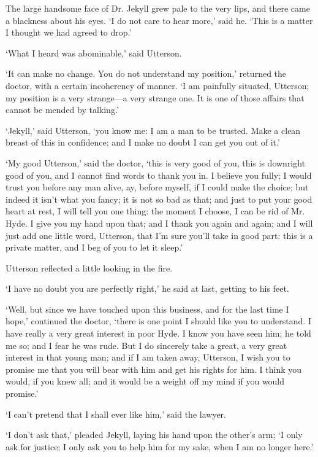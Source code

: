 \documentclass[]{novel}
\begin{document}
The large handsome face of Dr. Jekyll grew pale to the very lips, and there came a blackness about his eyes. ‘I do not care to hear more,’ said he. ‘This is a matter I thought we had agreed to drop.’

‘What I heard was abominable,’ said Utterson.

‘It can make no change. You do not understand my position,’ returned the doctor, with a certain incoherency of manner. ‘I am painfully situated, Utterson; my position is a very strange—a very strange one. It is one of those affairs that cannot be mended by talking.’

‘Jekyll,’ said Utterson, ‘you know me: I am a man to be trusted. Make a clean breast of this in confidence; and I make no doubt I can get you out of it.’

‘My good Utterson,’ said the doctor, ‘this is very good of you, this is downright good of you, and I cannot find words to thank you in. I believe you fully; I would trust you before any man alive, ay, before myself, if I could make the choice; but indeed it isn’t what you fancy; it is not so bad as that; and just to put your good heart at rest, I will tell you one thing: the moment I choose, I can be rid of Mr. Hyde. I give you my hand upon that; and I thank you again and again; and I will just add one little word, Utterson, that I’m sure you’ll take in good part: this is a private matter, and I beg of you to let it sleep.’

Utterson reflected a little looking in the fire.

‘I have no doubt you are perfectly right,’ he said at last, getting to his feet.

‘Well, but since we have touched upon this business, and for the last time I hope,’ continued the doctor, ‘there is one point I should like you to understand. I have really a very great interest in poor Hyde. I know you have seen him; he told me so; and I fear he was rude. But I do sincerely take a great, a very great interest in that young man; and if I am taken away, Utterson, I wish you to promise me that you will bear with him and get his rights for him. I think you would, if you knew all; and it would be a weight off my mind if you would promise.’

‘I can’t pretend that I shall ever like him,’ said the lawyer.

‘I don’t ask that,’ pleaded Jekyll, laying his hand upon the other’s arm; ‘I only ask for justice; I only ask you to help him for my sake, when I am no longer here.’
\end{document}
